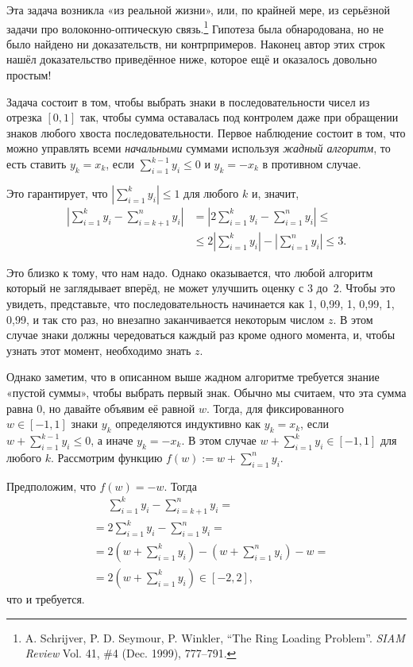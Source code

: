 Эта задача возникла «из реальной жизни», или, по крайней мере, из серьёзной задачи про волоконно-оптическую связь.\footnote{A. Schrijver, P. D. Seymour, P. Winkler, ``The Ring Loading Problem''. \emph{SIAM Review} Vol. 41, \#4 (Dec. 1999), 777--791.}
Гипотеза была обнародована, но не было найдено ни доказательств, ни контрпримеров.
Наконец автор этих строк нашёл доказательство приведённое ниже, которое ещё и оказалось довольно простым!

\medskip

Задача состоит в том, чтобы выбрать знаки в последовательности чисел из отрезка $[0,1]$ так, чтобы сумма оставалась под контролем даже при обращении знаков любого хвоста последовательности.
Первое наблюдение состоит в том, что можно управлять всеми \emph{начальными} суммами используя \emph{жадный алгоритм}, то есть ставить $y_k=x_k$, если $\sum_{i=1}^{k-1}y_i \le 0$ и $y_k=-x_k$ в противном случае.

Это гарантирует, что $\left|\sum_{i=1}^{k}y_i\right| \le 1$ для любого $k$ и, значит,
\begin{align*}
\left|\sum_{i=1}^{k}y_i-\sum_{i=k+1}^{n}y_i\right|&=\left|2\sum_{i=1}^{k}y_i-\sum_{i=1}^{n}y_i\right|\le
\\
&\le2\left|\sum_{i=1}^{k}y_i\right|-\left|\sum_{i=1}^{n}y_i\right|\le3.
\end{align*}

Это близко к тому, что нам надо. 
Однако оказывается, что любой алгоритм который не заглядывает вперёд, не может улучшить оценку с 3 до~2.
Чтобы это увидеть, представьте, что последовательность начинается как
1, 0,99, 1, 0,99, 1, 0,99, и так сто раз, но внезапно заканчивается некоторым числом $z$.
В этом случае знаки должны чередоваться каждый раз кроме одного момента, и, чтобы узнать этот момент, необходимо знать $z$.

Однако заметим, что в описанном выше жадном алгоритме требуется знание «пустой суммы», чтобы выбрать первый знак.
Обычно мы считаем, что эта сумма равна 0, но давайте объявим её равной $w$.
Тогда, для фиксированного $w\in [-1,1]$ знаки $y_k$ определяются индуктивно как $y_k=x_k$, если $w+\sum_{i=1}^{k-1}y_i \le 0$, а иначе $y_k=-x_k$.
В этом случае $w+\sum_{i=1}^{k}y_i \in[-1,1]$ для любого $k$.
Рассмотрим функцию $f(w) \mathop{{:}{=}} w+\sum_{i=1}^ny_i$.

Предположим, что $f(w)=-w$.
Тогда
\begin{align*}
&\phantom{=}\sum_{i=1}^{k}y_i-\sum_{i=k+1}^{n}y_i=
\\
&=2\sum_{i=1}^{k}y_i-\sum_{i=1}^{n}y_i=
\\
&=2\left(w+\sum_{i=1}^{k}y_i\right)-\left(w+\sum_{i=1}^{n}y_i\right)-w=
\\
&=2\left(w+\sum_{i=1}^{k}y_i\right)\in[-2,2],
\end{align*}
что и требуется.

